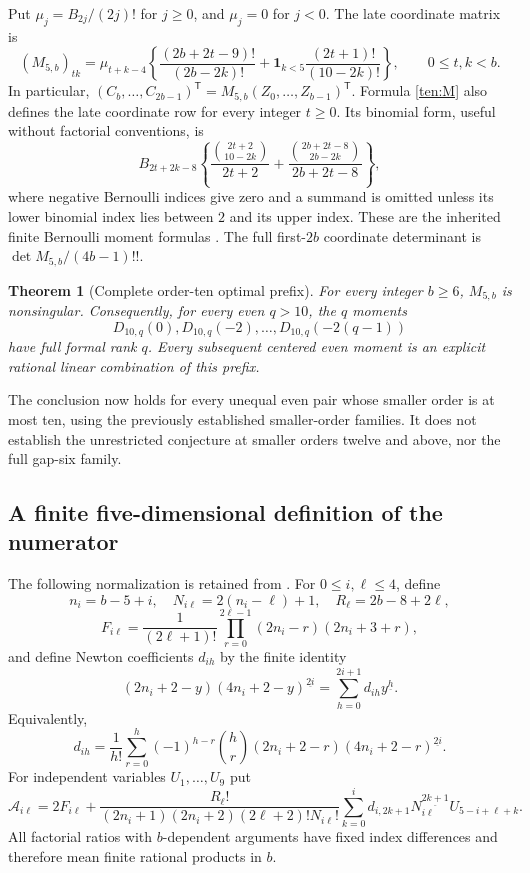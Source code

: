 \documentclass[11pt]{article}
\newtheorem{theorem}{Theorem}[section]
\theoremstyle{definition}
\theoremstyle{remark}
\numberwithin{equation}{section}
\begin{document}
Put $\mu_j=B_{2j}/(2j)!$ for $j\ge0$, and $\mu_j=0$ for $j<0$.
The late coordinate matrix is
\begin{equation}\label{ten:M}
 (M_{5,b})_{tk}=\mu_{t+k-4}
 \left\{\frac{(2b+2t-9)!}{(2b-2k)!}
 +\mathbf1_{k<5}\frac{(2t+1)!}{(10-2k)!}\right\},
 \qquad 0\le t,k<b.
\end{equation}
In particular,
$(C_b,\ldots,C_{2b-1})^{\mathsf T}
=M_{5,b}(Z_0,\ldots,Z_{b-1})^{\mathsf T}$.
Formula \eqref{ten:M} also defines the late coordinate row for
every integer $t\ge0$.  Its binomial form, useful without factorial
conventions, is
\[
 B_{2t+2k-8}\left\{
 \frac{\binom{2t+2}{10-2k}}{2t+2}
 +\frac{\binom{2b+2t-8}{2b-2k}}{2b+2t-8}\right\},
\]
where negative Bernoulli indices give zero and a summand is omitted
unless its lower binomial index lies between $2$ and its upper index.
These are the inherited finite Bernoulli moment formulas
\cite{GeneralHankel}.  The full first-$2b$ coordinate determinant is
$\det M_{5,b}/(4b-1)!!$.

\begin{theorem}[Complete order-ten optimal prefix]\label{ten:main}
For every integer $b\ge6$, $M_{5,b}$ is nonsingular.  Consequently,
for every even $q>10$, the $q$ moments
\[
 D_{10,q}(0),D_{10,q}(-2),\ldots,D_{10,q}(-2(q-1))
\]
have full formal rank $q$.  Every subsequent centered even moment
is an explicit rational linear combination of this prefix.
\end{theorem}

The conclusion now holds for every unequal even pair whose smaller
order is at most ten, using the previously established smaller-order
families.  It does not establish the unrestricted conjecture at
smaller orders twelve and above, nor the full gap-six family.

\subsection{A finite five-dimensional definition of the numerator}

The following normalization is retained from \cite{AlternatingIncoming}.
For $0\le i,\ell\le4$, define
\[
 n_i=b-5+i,\quad N_{i\ell}=2(n_i-\ell)+1,
 \quad R_\ell=2b-8+2\ell,
\]
\[
 F_{i\ell}=\frac1{(2\ell+1)!}
       \prod_{r=0}^{2\ell-1}(2n_i-r)(2n_i+3+r),
\]
and define Newton coefficients $d_{ih}$ by the finite identity
\begin{equation}\label{ten:Newton}
 (2n_i+2-y)(4n_i+2-y)^{\underline{2i}}
       =\sum_{h=0}^{2i+1}d_{ih}y^{\underline h}.
\end{equation}
Equivalently,
\[
 d_{ih}=\frac1{h!}\sum_{r=0}^{h}(-1)^{h-r}\binom hr
       (2n_i+2-r)(4n_i+2-r)^{\underline{2i}}.
\]
For independent variables $U_1,\ldots,U_9$ put
\begin{equation}\label{ten:calA}
 \mathcal A_{i\ell}=2F_{i\ell}+
 \frac{R_\ell!}{(2n_i+1)(2n_i+2)(2\ell+2)!N_{i\ell}!}
 \sum_{k=0}^{i}d_{i,2k+1}N_{i\ell}^{\underline{2k+1}}
                 U_{5-i+\ell+k}.
\end{equation}
All factorial ratios with $b$-dependent arguments have fixed index
differences and therefore mean finite rational products in $b$.
\end{document}

